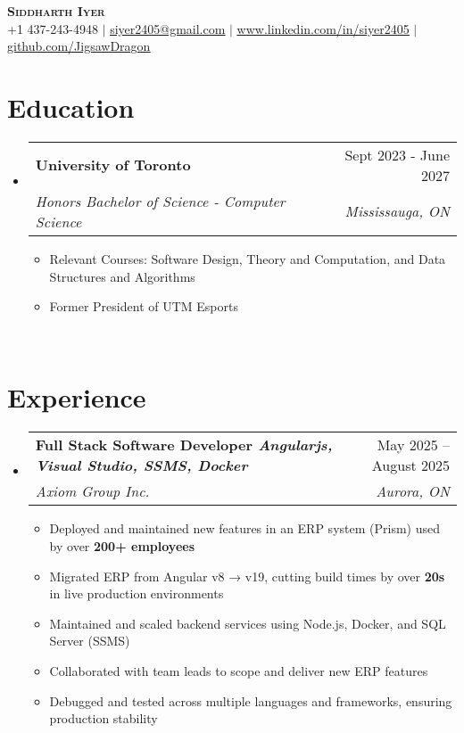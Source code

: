 \documentclass[letterpaper,11pt]{article}
\makeatletter
\newcommand{\resumeItem}[1]{
  \item\small{
    {#1 \vspace{-2pt}}
  }
}
\newcommand{\resumeSubheading}[4]{
  \vspace{-2pt}\item
    \begin{tabular*}{0.97\textwidth}[t]{l@{\extracolsep{\fill}}r}
      \textbf{#1} & #2 \\
      \textit{\small#3} & \textit{\small #4} \\
    \end{tabular*}\vspace{-7pt}
}
\newcommand{\resumeSubHeadingListStart}{\begin{itemize}[leftmargin=0.15in, label={}]}
\newcommand{\resumeSubHeadingListEnd}{\end{itemize}}
\newcommand{\resumeItemListStart}{\begin{itemize}}
\newcommand{\resumeItemListEnd}{\end{itemize}\vspace{-5pt}}
\makeatother
\begin{document}

\begin{center}
    \textbf{\Huge \scshape Siddharth Iyer} \\ \vspace{1pt}
    \small +1 437-243-4948 $|$ \href{mailto:x@x.com}{\underline{siyer2405@gmail.com}} $|$ 
    \href{https://linkedin.com/in/...}{\underline{www.linkedin.com/in/siyer2405}} $|$
    \href{https://github.com/...}{\underline{github.com/JigsawDragon}}
\end{center}


\section{Education}
  \resumeSubHeadingListStart
    \resumeSubheading
      {University of Toronto}{Sept 2023 - June 2027}
      {Honors Bachelor of Science -  Computer Science}{Mississauga, ON}
    \resumeItemListStart
        \resumeItem{Relevant Courses: Software Design, Theory and Computation, and Data Structures and Algorithms}
        \resumeItem{Former President of UTM Esports}
    \resumeItemListEnd
    \resumeSubHeadingListEnd
\
\section{Experience}
\resumeSubHeadingListStart
    \resumeSubheading
      {Full Stack Software Developer \textnormal{\emph{Angularjs, Visual Studio, SSMS, Docker}}}{ May 2025 -- August 2025}
      {Axiom Group Inc.}{Aurora, ON}
      \resumeItemListStart
      \resumeItem{Deployed and maintained new features in an ERP system (Prism) used by over \textbf{200+ employees}}
      \resumeItem{Migrated ERP from Angular v8 → v19, cutting build times by over \textbf{20s} in live production environments}
      \resumeItem{Maintained and scaled backend services using Node.js, Docker, and SQL Server (SSMS)}
      \resumeItem{Collaborated with team leads to scope and deliver new ERP features}
      \resumeItem{Debugged and tested across multiple languages and frameworks, ensuring production stability}
      \resumeItemListEnd
  \resumeSubHeadingListEnd
    
\end{document}
